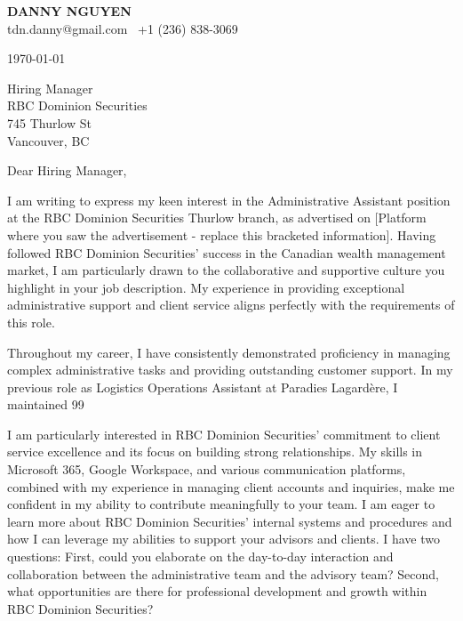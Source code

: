 \documentclass[letterpaper,11pt]{article}
\begin{document}
\textbf{DANNY NGUYEN} \\
tdn.danny@gmail.com \textbullet\ +1 (236) 838-3069 \\
\vspace{20pt}

\today \\
\vspace{20pt}

Hiring Manager \\
RBC Dominion Securities \\
745 Thurlow St \\
Vancouver, BC \\
\vspace{20pt}

Dear Hiring Manager, \\
\vspace{10pt}

I am writing to express my keen interest in the Administrative Assistant position at the RBC Dominion Securities Thurlow branch, as advertised on [Platform where you saw the advertisement -  replace this bracketed information].  Having followed RBC Dominion Securities' success in the Canadian wealth management market, I am particularly drawn to the collaborative and supportive culture you highlight in your job description. My experience in providing exceptional administrative support and client service aligns perfectly with the requirements of this role.

\vspace{10pt}

Throughout my career, I have consistently demonstrated proficiency in managing complex administrative tasks and providing outstanding customer support.  In my previous role as Logistics Operations Assistant at Paradies Lagardère, I maintained 99%

\vspace{10pt}

I am particularly interested in RBC Dominion Securities' commitment to client service excellence and its focus on building strong relationships. My skills in Microsoft 365, Google Workspace, and various communication platforms, combined with my experience in managing client accounts and inquiries, make me confident in my ability to contribute meaningfully to your team. I am eager to learn more about RBC Dominion Securities' internal systems and procedures and how I can leverage my abilities to support your advisors and clients.  I have two questions: First, could you elaborate on the day-to-day interaction and collaboration between the administrative team and the advisory team? Second, what opportunities are there for professional development and growth within RBC Dominion Securities?
\end{document}
